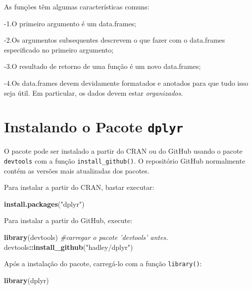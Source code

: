 \documentclass[a4paper]{book}
\newenvironment{Shaded}{\begin{snugshade}}{\end{snugshade}}
\newcommand{\CommentTok}[1]{\textcolor[rgb]{0.56,0.35,0.01}{\textit{#1}}}
\newcommand{\KeywordTok}[1]{\textcolor[rgb]{0.13,0.29,0.53}{\textbf{#1}}}
\newcommand{\NormalTok}[1]{#1}
\newcommand{\OperatorTok}[1]{\textcolor[rgb]{0.81,0.36,0.00}{\textbf{#1}}}
\newcommand{\StringTok}[1]{\textcolor[rgb]{0.31,0.60,0.02}{#1}}
\begin{document}
As funções têm algumas características comuns:

-1.O primeiro argumento é um data.frames;

-2.Os argumentos subsequentes descrevem o que fazer com o data.frames especificado no primeiro argumento;

-3.O resultado de retorno de uma função é um novo data.frames;

-4.Os data.frames devem devidamente formatados e anotados para que tudo isso seja útil. Em particular, os dados devem estar \emph{organizados}.

\hypertarget{instalando-o-pacote-dplyr}{%
\section{\texorpdfstring{Instalando o Pacote \texttt{dplyr}}{Instalando o Pacote dplyr}}\label{instalando-o-pacote-dplyr}}

O pacote pode ser instalado a partir do CRAN ou do GitHub usando o pacote \texttt{devtools} com a função \texttt{install\_github()}. O repositório GitHub normalmente contém as versões mais atualizadas dos pacotes.

Para instalar a partir do CRAN, bastar executar:

\begin{Shaded}
\begin{Highlighting}[]
\KeywordTok{install.packages}\NormalTok{(}\StringTok{"dplyr"}\NormalTok{)}
\end{Highlighting}
\end{Shaded}

Para instalar a partir do GitHub, execute:

\begin{Shaded}
\begin{Highlighting}[]
\KeywordTok{library}\NormalTok{(devtools) }\CommentTok{#carregar o pacote 'devtools' antes.}
\NormalTok{devtools}\OperatorTok{::}\KeywordTok{install_github}\NormalTok{(}\StringTok{"hadley/dplyr"}\NormalTok{)}
\end{Highlighting}
\end{Shaded}

Após a instalação do pacote, carregá-lo com a função \texttt{library()}:

\begin{Shaded}
\begin{Highlighting}[]
\KeywordTok{library}\NormalTok{(dplyr)}
\end{Highlighting}
\end{Shaded}
\end{document}
